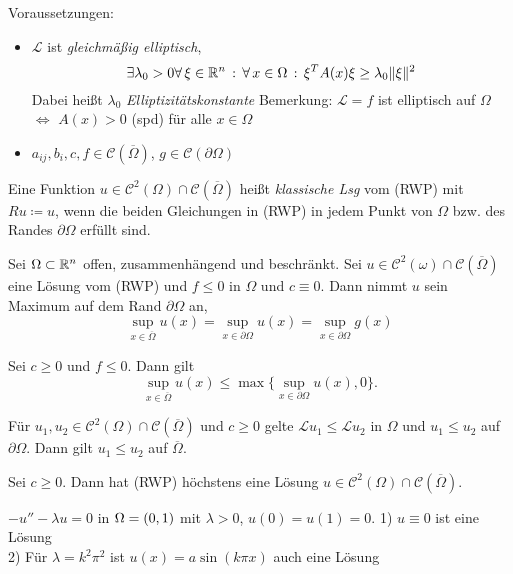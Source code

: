 \documentclass{cheat-sheet}
\newcommand{\Cont}{\mathcal{C}} %
\newcommand{\clos}[1]{\overline{#1}} %
\newcommand{\cOmega}{\clos{\Omega}} %
\newcommand{\bOmega}{\partial \Omega} %
\renewcommand{\L}{\mathcal{L}} %
\begin{document}
Voraussetzungen:

\begin{itemize}
  \item $\L$ ist \emph{gleichmäßig elliptisch}, \dh{}
  \[ \exists{\lambda_0 > 0} \forall \, {\xi \in \mathbb{R}^n} \,:\, \forall \, {x \in \Omega} \,:\, \xi^T A(x) \xi \geq \lambda_0 \lVert\xi\rVert^2 \]
  Dabei heißt $\lambda_0$ \emph{Elliptizitätskonstante}
  Bemerkung: $\L = f$ ist elliptisch auf $\Omega$ $\iff$ $A(x) > 0$ (spd) für alle $x \in \Omega$
  \item $a_{ij}, b_i, c, f \in \Cont(\cOmega)$, $g \in \Cont(\bOmega)$
\end{itemize}

\begin{defn}
  Eine Funktion $u \in \Cont^2(\Omega) \cap \Cont(\cOmega)$ heißt \emph{klassische Lsg} vom (RWP) mit $Ru \coloneqq u$, wenn die beiden Gleichungen in (RWP) in jedem Punkt von $\Omega$ bzw. des Randes $\bOmega$ erfüllt sind.
\end{defn}

\begin{satz}
  Sei $\Omega \subset \mathbb{R}^n$ offen, zusammenhängend und beschränkt.
  Sei $u \in \Cont^2(\omega) \cap \Cont(\cOmega)$ eine Lösung vom (RWP) und $f \leq 0$ in $\Omega$ und $c \equiv 0$. Dann nimmt $u$ sein Maximum auf dem Rand $\bOmega$ an, \dh{}
  \[ \sup_{x \in \cOmega} u(x) = \sup_{x \in \bOmega} u(x) = \sup_{x \in \bOmega} g(x) \]
\end{satz}


\begin{kor}
  Sei $c \geq 0$ und $f \leq 0$.
  Dann gilt
  \[ \sup_{x \in \cOmega} u(x) \leq \max \{ \sup_{x \in \bOmega} u(x), 0 \}. \]
\end{kor}

\begin{kor}
  Für $u_1, u_2 \in \Cont^2(\Omega) \cap \Cont(\cOmega)$ und $c \geq 0$ gelte $\L u_1 \leq \L u_2$ in $\Omega$ und $u_1 \leq u_2$ auf $\bOmega$.
  Dann gilt $u_1 \leq u_2$ auf $\cOmega$.
\end{kor}

\begin{kor}[Eindeutigkeit]
  Sei $c \geq 0$. Dann hat (RWP) höchstens eine Lösung $u \in \Cont^2(\Omega) \cap \Cont(\cOmega)$.
\end{kor}

\begin{bsp}
  $-u'' - \lambda u = 0$ in $\Omega = \left( 0, 1 \right)$ mit $\lambda > 0$, $u(0) = u(1) = 0$.
  1) $u \equiv 0$ ist eine Lösung \\
  2) Für $\lambda = k^2 \pi^2$ ist $u(x) = a \sin(k \pi x)$ auch eine Lösung
\end{bsp}
\end{document}
